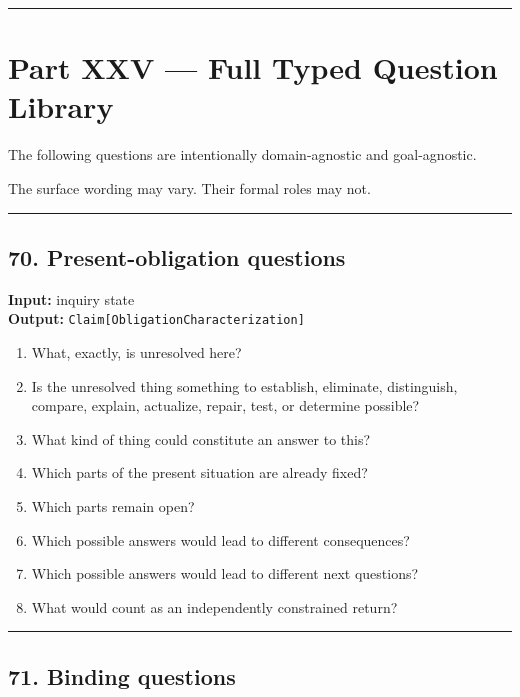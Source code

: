 \documentclass[
]{article}
\providecommand{\tightlist}{%
  \setlength{\itemsep}{0pt}\setlength{\parskip}{0pt}}
\begin{document}
\begin{center}\rule{0.5\linewidth}{0.5pt}\end{center}

\section{Part XXV --- Full Typed Question
Library}\label{part-xxv-full-typed-question-library}

The following questions are intentionally domain-agnostic and
goal-agnostic.

The surface wording may vary. Their formal roles may not.

\begin{center}\rule{0.5\linewidth}{0.5pt}\end{center}

\subsection{70. Present-obligation
questions}\label{present-obligation-questions}

\textbf{Input:} inquiry state\\
\textbf{Output:} \texttt{Claim{[}ObligationCharacterization{]}}

\begin{enumerate}
\def\labelenumi{\arabic{enumi}.}
\tightlist
\item
  What, exactly, is unresolved here?
\item
  Is the unresolved thing something to establish, eliminate,
  distinguish, compare, explain, actualize, repair, test, or determine
  possible?
\item
  What kind of thing could constitute an answer to this?
\item
  Which parts of the present situation are already fixed?
\item
  Which parts remain open?
\item
  Which possible answers would lead to different consequences?
\item
  Which possible answers would lead to different next questions?
\item
  What would count as an independently constrained return?
\end{enumerate}

\begin{center}\rule{0.5\linewidth}{0.5pt}\end{center}

\subsection{71. Binding questions}\label{binding-questions}
\end{document}
